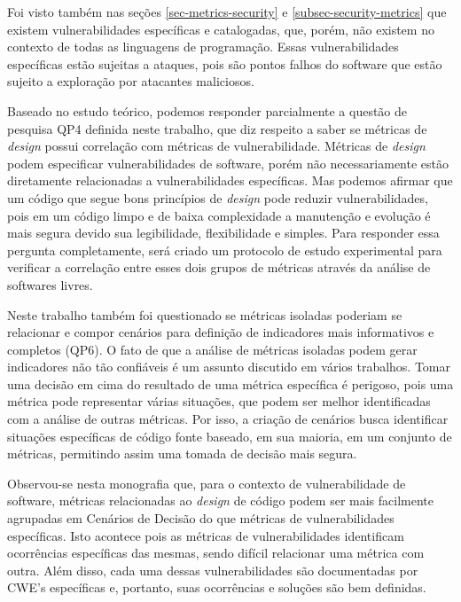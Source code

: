 %

Foi visto também nas seções \ref{sec-metrics-security} e \ref{subsec-security-metrics} que existem vulnerabilidades específicas e catalogadas, que, porém, não existem no contexto de todas as linguagens de programação. Essas vulnerabilidades específicas estão sujeitas a ataques, pois são pontos falhos do software que estão sujeito a exploração por atacantes maliciosos. 

%

Baseado no estudo teórico, podemos responder parcialmente a questão de pesquisa QP4 definida neste trabalho, que diz respeito a saber se métricas de \emph{design} possui correlação com métricas de vulnerabilidade. Métricas de \emph{design} podem especificar vulnerabilidades de software, porém não necessariamente estão diretamente relacionadas a vulnerabilidades específicas. Mas podemos afirmar que um código que segue bons princípios de \emph{design} pode reduzir vulnerabilidades, pois em um código limpo e de baixa complexidade a manutenção e evolução é mais segura devido sua legibilidade, flexibilidade e simples. Para responder essa pergunta completamente, será criado um protocolo de estudo experimental para verificar a correlação entre esses dois grupos de métricas através da análise de softwares livres.

%

Neste trabalho também foi questionado se métricas isoladas poderiam se relacionar e compor cenários para definição de indicadores mais informativos e completos (QP6). O fato de que a análise de métricas isoladas podem gerar indicadores não tão confiáveis é um assunto discutido em vários trabalhos. Tomar uma decisão em cima do resultado de uma métrica específica é perigoso, pois uma métrica pode representar várias situações, que podem ser melhor identificadas com a análise de outras métricas. Por isso, a criação de cenários busca identificar situações específicas de código fonte baseado, em sua maioria, em um conjunto de métricas, permitindo assim uma tomada de decisão mais segura. 

%

Observou-se nesta monografia que, para o contexto de vulnerabilidade de software, métricas relacionadas ao \emph{design} de código podem ser mais facilmente agrupadas em Cenários de Decisão do que métricas de vulnerabilidades específicas. Isto acontece pois as métricas de vulnerabilidades identificam ocorrências específicas das mesmas, sendo difícil relacionar uma métrica com outra. Além disso, cada uma dessas vulnerabilidades são documentadas por CWE's específicas e, portanto, suas ocorrências e soluções são bem definidas.

